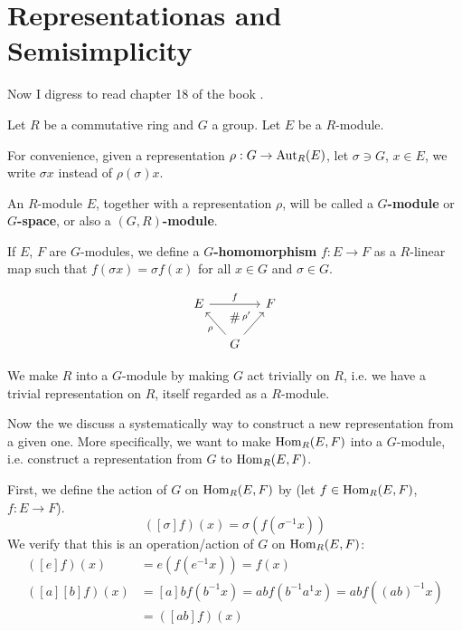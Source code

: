 \section{Representationas and Semisimplicity}
\label{sec:Representationas-and-Semisimplicity}

Now I digress to read chapter 18 of the book \cite{lang-algebra}.

Let $R$ be a commutative ring and $G$ a group. Let $E$ be a
$R$-module.

For convenience, given a representation $\rho:G\to \operatorname{Aut}_R(E)$, let
$\sigma\ni G$, $x\in E$, we write $\sigma x$ instead of
$\rho(\sigma)x$.

An $R$-module $E$, together with a representation $\rho$, will be
called a \textbf{$G$-module} or
\textbf{$G$-space}, or also a
\textbf{$(G,R)$-module}.

If $E$, $F$ are $G$-modules, we define a
\textbf{$G$-homomorphism}
$f:E\to F$ as a $R$-linear map such that $f(\sigma x) = \sigma f(x)$
for all $x\in G$ and $\sigma\in G$.

\begin{equation}
    \begin{tikzcd}[column sep=small]
        E \ar[rr,"f"] &
        \ar[d,phantom, "\#", near start] & F \\
        & G\ar[ul,"\rho"]\ar[ur,"\rho'"] &  \,
    \end{tikzcd}
\end{equation}

We make $R$ into a $G$-module by making $G$ act trivially on $R$, i.e.
we have a trivial representation on $R$, itself regarded as a
$R$-module.

\begin{key}
Now the we discuss a systematically way to construct a new
representation from a given one. More specifically, we want to make
$\operatorname{Hom}_R(E,F)$ into a $G$-module, i.e. construct a representation from
$G$ to $\operatorname{Hom}_R(E,F)$.

First, we define the action of $G$ on $\operatorname{Hom}_R(E,F)$ by (let $f\in
\operatorname{Hom}_R(E,F)$, $f: E\to F$).
\begin{equation}
    ([\sigma] f) (x) = \sigma (f(\sigma^{-1}x))
\end{equation}
We verify that this is an operation/action of $G$ on $\operatorname{Hom}_R(E,F)$:
\begin{align*}
    ([e] f) (x) &= e (f(e^{-1}x)) = f(x) \\
    ([a] [b] f )(x) &= [a] bf(b^{-1}x) = ab f(b^{-1}a^{1}x) =
    abf((ab)^{-1}x) \\
    &= ([ab] f)(x)
\end{align*}
\end{key}

